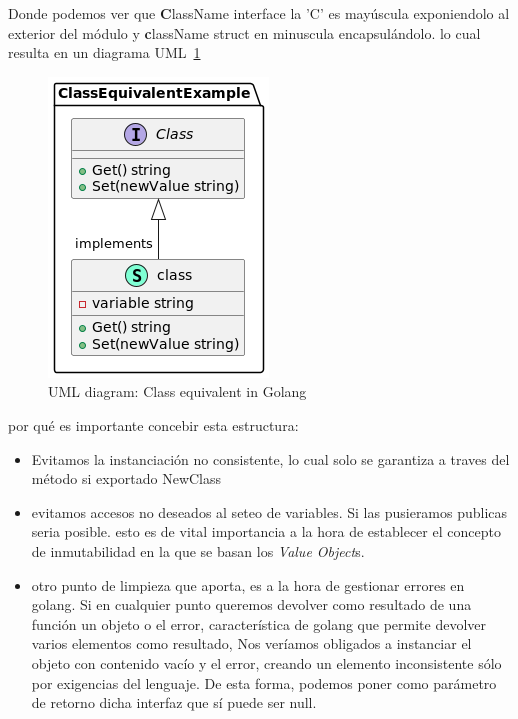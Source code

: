 Donde podemos ver que \textbf{C}lassName interface la 'C' es mayúscula exponiendolo al exterior del módulo y \textbf{c}lassName struct en minuscula encapsulándolo.
lo cual resulta en un diagrama UML~\cref{fig: uml Diagram Class Equivalent in Golang}

\begin{figure}[H]
    \centering
    \includegraphics[height=0.3\textheight]{./part/Proyecto_ejecutivo/memoria_constructiva/ClassEquivalentInGolang}
    \caption{UML diagram: Class equivalent in Golang}\label{fig: uml Diagram Class Equivalent in Golang}
\end{figure}

por qué es importante concebir esta estructura:

\begin{itemize}
    \item Evitamos la instanciación no consistente, lo cual solo se garantiza a traves del método si exportado NewClass
    \item evitamos accesos no deseados al seteo de variables. Si las pusieramos publicas seria posible. esto es de vital importancia a la hora de establecer el concepto de inmutabilidad en la que se basan los \textit{Value Object}s.
    \item otro punto de limpieza que aporta, es a la hora de gestionar errores en golang. Si en cualquier punto queremos devolver como resultado de una función un objeto o el error, característica de golang que permite devolver varios elementos como resultado, Nos veríamos obligados a instanciar el objeto con contenido vacío y el error, creando un elemento inconsistente sólo por exigencias del lenguaje. De esta forma, podemos poner como parámetro de retorno dicha interfaz que sí puede ser null.
\end{itemize}

